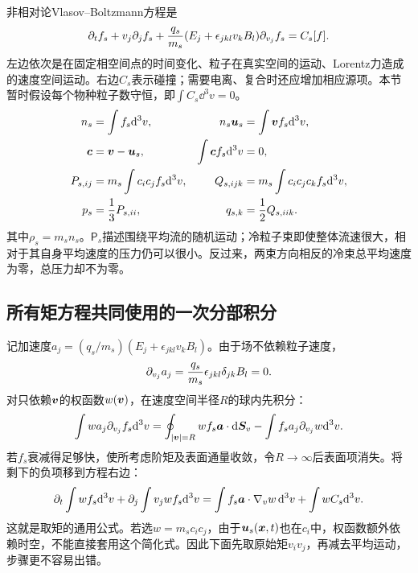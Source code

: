 \documentclass[UTF8,a4paper,11pt,openany,fontset=fandol]{ctexbook}
\begin{document}
非相对论Vlasov--Boltzmann方程是
\begin{equation}
 \partial_tf_s+v_j\partial_jf_s+
 {q_s\over m_s}(E_j+\epsilon_{jkl}v_kB_l)\partial_{v_j}f_s=C_s[f].
 \label{eq:vlasov}
\end{equation}
左边依次是在固定相空间点的时间变化、粒子在真实空间的运动、Lorentz力造成的速度空间运动。右边$C_s$表示碰撞；需要电离、复合时还应增加相应源项。本节暂时假设每个物种粒子数守恒，即$\int C_s\dd^3v=0$。
\begin{align}
 n_s&=\int f_s\mathrm d^3v,&
 n_s\bm{u}_s&=\int\bm{v} f_s\mathrm d^3v,\\
 \bm{c}&=\bm{v}-\bm{u}_s,&
 \int\bm{c} f_s\mathrm d^3v&=0,\\
 P_{s,ij}&=m_s\int c_ic_j f_s\mathrm d^3v,&
 Q_{s,ijk}&=m_s\int c_ic_jc_k f_s\mathrm d^3v,\\
 p_s&={1\over3}P_{s,ii},&
 q_{s,k}&={1\over2}Q_{s,iik}.
\end{align}
其中$\rho_s=m_sn_s$。$\mathsf P_s$描述围绕平均流的随机运动；冷粒子束即使整体流速很大，相对于其自身平均速度的压力仍可以很小。反过来，两束方向相反的冷束总平均速度为零，总压力却不为零。

\subsection{所有矩方程共同使用的一次分部积分}
记加速度$a_j=(q_s/m_s)(E_j+\epsilon_{jkl}v_kB_l)$。由于场不依赖粒子速度，
\begin{equation}
 \partial_{v_j}a_j={q_s\over m_s}\epsilon_{jkl}\delta_{jk}B_l=0.
\end{equation}
对只依赖$\bm{v}$的权函数$w(\bm{v})$，在速度空间半径$R$的球内先积分：
\begin{equation}
 \int w a_j\partial_{v_j}f_s\mathrm d^3v
 =\oint_{|\bm{v}|=R}w f_s\bm{a}\cdot\mathrm d\bm{S}_v
 -\int f_s a_j\partial_{v_j}w\mathrm d^3v.
\end{equation}
若$f_s$衰减得足够快，使所考虑阶矩及表面通量收敛，令$R\to\infty$后表面项消失。将剩下的负项移到方程右边：
\begin{equation}
 \partial_t\int wf_s\mathrm d^3v+\partial_j\int v_jwf_s\mathrm d^3v
 =\int f_s\bm{a}\cdot\nabla_vw\,\mathrm d^3v+\int wC_s\mathrm d^3v.
 \label{eq:tutorial-mastermoment}
\end{equation}
这就是取矩的通用公式。若选$w=m_sc_ic_j$，由于$\bm{u}_s(\bm{x},t)$也在$c_i$中，权函数额外依赖时空，不能直接套用这个简化式。因此下面先取原始矩$v_iv_j$，再减去平均运动，步骤更不容易出错。
\end{document}
